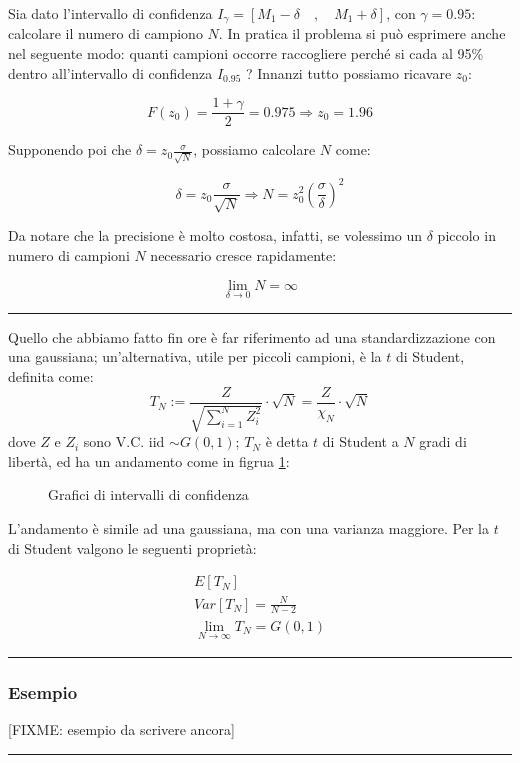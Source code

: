\begin{esempio} %
Sia dato l'intervallo di confidenza $I_\gamma=\left[ M_1-\delta \quad ,\quad M_1+\delta \right] $, con $\gamma=0.95$: calcolare il numero di campiono $N$. In pratica il problema si può esprimere anche nel seguente modo: quanti campioni occorre raccogliere perché si cada al 95\% dentro all'intervallo di confidenza $I_{0.95}$ ?\newline
Innanzi tutto possiamo ricavare $z_0$:

  \[ F(z_0)=\frac{1+\gamma}{2}=0.975 \Longrightarrow z_0=1.96 \]
  
Supponendo poi che $\delta=z_0\frac{\sigma}{\sqrt{N}}$, possiamo calcolare $N$ come:

  \[ \delta=z_0\frac{\sigma}{\sqrt{N}} \Longrightarrow N=z_0^2\left( \frac{\sigma}{\delta}\right) ^2 \]
  
Da notare che la precisione è molto costosa, infatti, se volessimo un $\delta$ piccolo in numero di campioni $N$ necessario cresce rapidamente:

\[ \lim_{\delta \rightarrow 0} {N}=\infty \]
\end{esempio}
\begin{center} \rule{300pt}{1pt} \end{center}

Quello che abbiamo fatto fin ore è far riferimento ad una standardizzazione con una gaussiana; un'alternativa, utile per piccoli campioni, è la $t$ di Student, definita come:
\[ T_N:=\frac{Z}{\sqrt{\sum_{i=1}^{N}Z_i^2}} \cdot \sqrt{N}=\frac{Z}{\chi_N} \cdot \sqrt{N} \]
dove $Z$ e $Z_i$ sono V.C. iid $\sim G(0,1)$; $T_N$ è detta $t$ di Student a $N$ gradi di libertà, ed ha un andamento come in figrua \ref{fig:grafIntConfTstud}:
  \begin{figure}[htbp]
    \centering
    \caption{Grafici di intervalli di confidenza \label{fig:grafIntConfTstud}}
  \end{figure}
L'andamento è simile ad una gaussiana, ma con una varianza maggiore. Per la $t$ di Student valgono le seguenti proprietà:

  \begin{gather*}
    E[T_N]\\
    Var[T_N]=\frac{N}{N-2}\\
    \lim_{N\rightarrow \infty} T_N = G(0,1)
  \end{gather*}
  
\begin{center} \rule{300pt}{1pt} \end{center}

\subsubsection{Esempio} %
[FIXME: esempio da scrivere ancora]
\begin{center} \rule{300pt}{1pt} \end{center}
